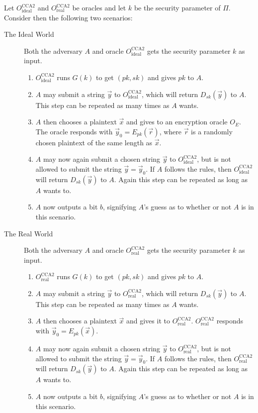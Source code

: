 Let $O_{\mathrm{ideal}}^{\mathrm{CCA}2}$ and $O_{\mathrm{real}}^{\mathrm{CCA}2}$ be oracles and let $k$ be the security parameter of $\Pi$. Consider then the following two scenarios:
\begin{description}
	\item[The Ideal World] Both the adversary $A$ and oracle $O_{\mathrm{ideal}}^{\mathrm{CCA}2}$ gets the security parameter $k$ as input.
		\begin{enumerate}
			\item $O_{\mathrm{ideal}}^{\mathrm{CCA}2}$ runs $G\left(k\right)$ to get $\left(pk, sk\right)$ and gives $pk$ to $A$.
			\item $A$ may submit a string $\vec{y}$ to $O_{\mathrm{ideal}}^{\mathrm{CCA}2}$, which will return $D_{sk}\left(\vec{y}\right)$ to $A$. This step can be repeated as many times as $A$ wants.
			\item $A$ then chooses a plaintext $\vec{x}$ and gives to an encryption oracle $O_E$. The oracle responds with $\vec{y}_0 = E_{pk}\left(\vec{r}\right)$, where $\vec{r}$ is a randomly chosen plaintext of the same length as $\vec{x}$.
			\item $A$ may now again submit a chosen string $\vec{y}$ to $O_{\mathrm{ideal}}^{\mathrm{CCA}2}$, but is not allowed to submit the string $\vec{y} = \vec{y}_0$. If $A$ follows the rules, then $O_{\mathrm{ideal}}^{\mathrm{CCA}2}$ will return $D_{sk}\left(\vec{y}\right)$ to $A$. Again this step can be repeated as long as $A$ wants to.
			\item $A$ now outputs a bit $b$, signifying $A$'s guess as to whether or not $A$ is in this scenario.
		\end{enumerate}
	\item[The Real World] Both the adversary $A$ and oracle $O_{\mathrm{real}}^{\mathrm{CCA}2}$ gets the security parameter $k$ as input.
	\begin{enumerate}
		\item $O_{\mathrm{real}}^{\mathrm{CCA}2}$ runs $G\left(k\right)$ to get $\left(pk, sk\right)$ and gives $pk$ to $A$.
		\item $A$ may submit a string $\vec{y}$ to $O_{\mathrm{real}}^{\mathrm{CCA}2}$, which will return $D_{sk}\left(\vec{y}\right)$ to $A$. This step can be repeated as many times as $A$ wants.
		\item $A$ then chooses a plaintext $\vec{x}$ and gives it to $O_{\mathrm{real}}^{\mathrm{CCA}2}$. $O_{\mathrm{real}}^{\mathrm{CCA}2}$ responds with $\vec{y}_0 = E_{pk}\left(\vec{x}\right)$.
		\item $A$ may now again submit a chosen string $\vec{y}$ to $O_{\mathrm{real}}^{\mathrm{CCA}2}$, but is not allowed to submit the string $\vec{y} = \vec{y}_0$. If $A$ follows the rules, then $O_{\mathrm{real}}^{\mathrm{CCA}2}$ will return $D_{sk}\left(\vec{y}\right)$ to $A$. Again this step can be repeated as long as $A$ wants to.
		\item $A$ now outputs a bit $b$, signifying $A$'s guess as to whether or not $A$ is in this scenario.
	\end{enumerate}
\end{description}
